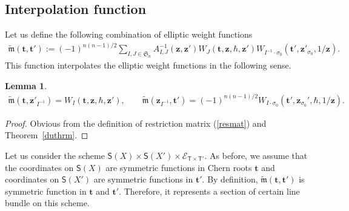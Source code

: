 \documentclass[pdftex]{sigma}
\newcommand{\bT}{\mathsf{T}}
\newcommand{\cE}{\mathscr{E}}
\def\ttt{{\boldsymbol t}}
\def\zz{{\boldsymbol z}}
\numberwithin{equation}{section}
\newtheorem{Lemma}[Theorem]{Lemma}
\begin{document}
\subsection{Interpolation function}
Let us define the following combination of elliptic weight functions
\begin{gather*}
\tilde{\mathfrak{m}}(\ttt,\ttt'):=(-1)^{n(n-1)/2}\sum\limits_{I,J\in \mathfrak{S}_n} A_{I,J}^{-1}(\zz,\zz') W_{J}(\ttt,\zz,\hbar,\zz') W_{I^{-1}\cdot \sigma_{0}}(\ttt',\zz'_{\sigma_0},1/\zz).
\end{gather*}
This function interpolates the elliptic weight functions in the following sense.
\begin{Lemma} \label{motherlemma}
 \begin{gather*}
 \tilde{\mathfrak{m}}(\ttt,\zz'_{I^{-1}})= W_{I}(\ttt,\zz,\hbar,\zz'), \qquad \tilde{\mathfrak{m}}(\zz_{I^{-1}},\ttt')= (-1)^{n(n-1)/2} W_{I \cdot \sigma_{0}}(\ttt',\zz_{\sigma_0}',\hbar,1/\zz).
 \end{gather*}
\end{Lemma}
\begin{proof}
 Obvious from the definition of restriction matrix (\ref{resmat}) and Theorem~\ref{duthrm}.
\end{proof}

Let us consider the scheme $\mathsf{S}(X)\times \mathsf{S}(X') \times \cE_{\bT\times \bT'}$. As before, we assume that the coordinates on
$\mathsf{S}(X)$ are symmetric functions in Chern roots $\ttt$ and coordinates on $\mathsf{S}(X')$
are symmetric functions in $\ttt'$. By definition, $\tilde{\mathfrak{m}}(\ttt,\ttt')$ is symmetric function in $\ttt$ and $\ttt'$. Therefore, it represents a section of certain line bundle on this scheme.
\end{document}
